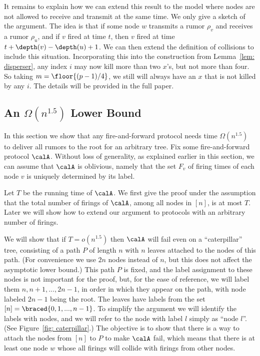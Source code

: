 It remains to explain how we can extend this result to the model where
nodes are not allowed to receive and transmit at the same time. We only
give a sketch of the argument. The idea is that if some node $w$ transmits a rumor
$\rho_v$ and receives a rumor $\rho_u$, and if $v$ fired at time $t$, then 
$v$ fired at time $t+\depth(v) - \depth(u)+1$. We can then extend the
definition of collisions to include this situation. Incorporating this into
the construction from Lemma~\ref{lem: disperser}, any index $i$ may now
kill more than two $x$'s, but not more than four. So taking $m = \floor{(p-1)/4}$,
we still will always have an $x$ that is not killed by any $i$.
The details will be provided in the full paper.



\subsection{An $\Omega(n^{1.5})$ Lower Bound}

In this section we show that any fire-and-forward protocol needs time $\Omega(n^{1.5})$ to
deliver all rumors to the root for an arbitrary tree. Fix some fire-and-forward protocol
$\calA$. Without loss of generality, as explained earlier in this section, we can
assume that $\calA$ is oblivious, namely that the set $F_v$ of firing times of each
node $v$ is uniquely determined by its label. 

Let $T$ be the running time of $\calA$.
We first give the proof under the assumption that the total number of firings
of $\calA$, among all nodes in $[n]$, 
is at most $T$. Later we will show how to extend our
argument to protocols with an arbitrary number of firings.

We will show that if $T = o(n^{1.5})$ then
$\calA$ will fail even on a ``caterpillar'' tree,
consisting of a path $P$ of length $n$ with $n$ leaves attached to the
nodes of this path. (For convenience we use $2n$ nodes
instead of $n$, but this does not affect the asymptotic lower bound.)
This path $P$ is fixed, and the label assignment to these nodes is not important
for the proof, but, for the ease of reference,
we will label them $n,n+1,...,2n-1$, in order in which they appear on the path,
with node labeled $2n-1$ being the root. 
The leaves have labels from the set $[n] = \braced{0,1,...,n-1}$. 
To simplify the argument we will identify
the labels with nodes, and we will refer to the node with label $l$ simply
as ``node $l$''. (See Figure~\ref{fig: caterpillar}.)
The objective is to show that there is a way to attach
the nodes from $[n]$ to $P$ to make $\calA$ fail, which means that
there is at least one node $w$ whose all firings will collide with
firings from other nodes.

